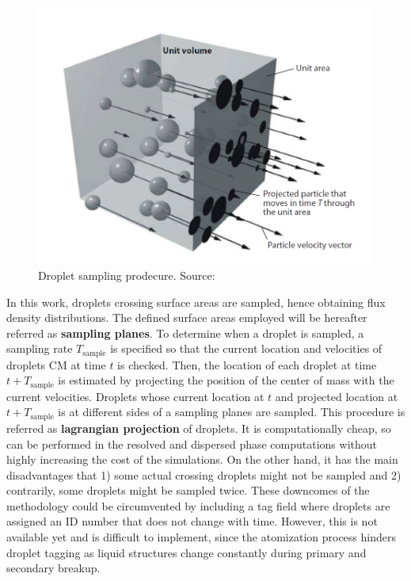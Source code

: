 \begin{figure}[h!]
	\centering
	\includegraphics[scale=0.6]{./part2_developments/figures_ch4_SLI/tropea_droplet_sampling}
	\caption{Droplet sampling prodecure. Source: }
	\label{fig:tropea_droplet_sampling}
\end{figure}

In this work, droplets crossing surface areas are sampled, hence obtaining flux density distributions. The defined surface areas employed will be hereafter referred as \textbf{sampling planes}. To determine when a droplet is sampled, a sampling rate $T_\mathrm{sample}$ is specified so that the current location and velocities of droplets CM at time $t$ is checked. Then, the location of each droplet at time $t + T_\mathrm{sample}$ is estimated by projecting the position of the center of mass with the current velocities. Droplets whose current location at $t$ and projected location at $t + T_\mathrm{sample}$ is at different sides of a sampling planes are sampled. This procedure is referred as \textbf{lagrangian projection} of droplets. It is computationally cheap, so can be performed in the resolved and dispersed phase computations without highly increasing the cost of the simulations. On the other hand, it has the main disadvantages that 1) some actual crossing droplets might not be sampled and 2) contrarily, some droplets might be sampled twice. These downcomes of the methodology could be circumvented by including a tag field where droplets are assigned an ID number that does not change with time. However, this is not available yet and is difficult to implement, since the atomization process hinders droplet tagging as liquid structures change constantly during primary and secondary breakup.

